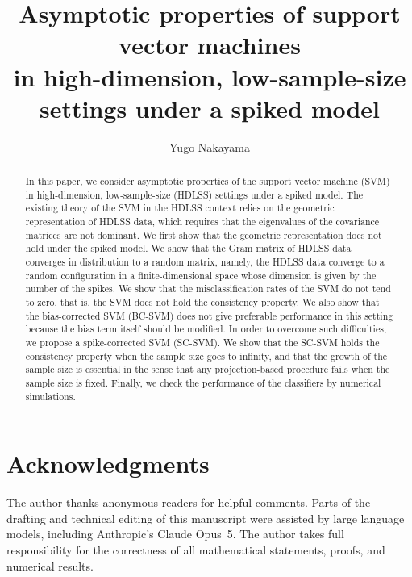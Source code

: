 \documentclass[11pt,a4paper]{amsart}
\title[Spiked SVM under HDLSS]{Asymptotic properties of support vector machines\\
in high-dimension, low-sample-size settings under a spiked model}
\author{Yugo Nakayama}
\author@andify\authors
\numberwithin{equation}{section}
\theoremstyle{definition}
\theoremstyle{remark}
\begin{document}
\begin{abstract}
In this paper, we consider asymptotic properties of the support vector machine (SVM)
in high-dimension, low-sample-size (HDLSS) settings under a spiked model.
The existing theory of the SVM in the HDLSS context relies on the geometric
representation of HDLSS data, which requires that the eigenvalues of the covariance
matrices are not dominant. We first show that the geometric representation does not
hold under the spiked model. We show that the Gram matrix of HDLSS data converges
in distribution to a random matrix, namely, the HDLSS data converge to a random
configuration in a finite-dimensional space whose dimension is given by the number
of the spikes. We show that the misclassification rates of the SVM do not tend to
zero, that is, the SVM does not hold the consistency property. We also show that
the bias-corrected SVM (BC-SVM) does not give preferable performance in this setting
because the bias term itself should be modified. In order to overcome such
difficulties, we propose a spike-corrected SVM (SC-SVM). We show that the SC-SVM
holds the consistency property when the sample size goes to infinity, and that the
growth of the sample size is essential in the sense that any projection-based
procedure fails when the sample size is fixed. Finally, we check the performance
of the classifiers by numerical simulations.
\end{abstract}


\maketitle

\tableofcontents













\appendix


\section*{Acknowledgments}
The author thanks anonymous readers for helpful comments.
Parts of the drafting and technical editing of this manuscript were assisted by
large language models, including Anthropic's Claude Opus~5.
The author takes full responsibility for the correctness of all mathematical
statements, proofs, and numerical results.
\end{document}
